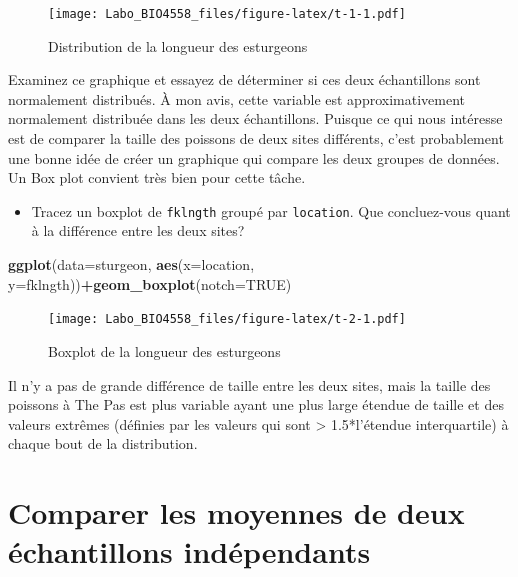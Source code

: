 \documentclass[12pt,]{book}
\newenvironment{Shaded}{\begin{snugshade}}{\end{snugshade}}
\newcommand{\DataTypeTok}[1]{\textcolor[rgb]{0.27,0.27,0.27}{#1}}
\newcommand{\KeywordTok}[1]{\textcolor[rgb]{0.27,0.27,0.27}{\textbf{#1}}}
\newcommand{\NormalTok}[1]{#1}
\newcommand{\OperatorTok}[1]{\textcolor[rgb]{0.43,0.43,0.43}{\textbf{#1}}}
\newcommand{\OtherTok}[1]{\textcolor[rgb]{0.37,0.37,0.37}{#1}}
\providecommand{\tightlist}{%
  \setlength{\itemsep}{0pt}\setlength{\parskip}{0pt}}
\begin{document}
\begin{figure}
\centering
\texttt{[image: Labo\_BIO4558\_files/figure-latex/t-1-1.pdf]}
\caption{\label{fig:t-1}Distribution de la longueur des esturgeons}
\end{figure}

Examinez ce graphique et essayez de déterminer si ces deux échantillons sont normalement distribués. À mon avis, cette variable est approximativement normalement distribuée dans les deux échantillons. Puisque ce qui nous intéresse est de comparer la taille des poissons de deux sites différents, c'est probablement une bonne idée de créer un graphique qui compare les deux groupes de données. Un Box plot convient très bien pour cette tâche.

\begin{itemize}
\tightlist
\item
  Tracez un boxplot de \texttt{fklngth} groupé par \texttt{location}. Que concluez-vous quant à la différence entre les deux sites?
\end{itemize}

\begin{Shaded}
\begin{Highlighting}[]
\KeywordTok{ggplot}\NormalTok{(}\DataTypeTok{data=}\NormalTok{sturgeon, }\KeywordTok{aes}\NormalTok{(}\DataTypeTok{x=}\NormalTok{location,}
\DataTypeTok{y=}\NormalTok{fklngth))}\OperatorTok{+}\KeywordTok{geom_boxplot}\NormalTok{(}\DataTypeTok{notch=}\OtherTok{TRUE}\NormalTok{)}
\end{Highlighting}
\end{Shaded}

\begin{figure}
\centering
\texttt{[image: Labo\_BIO4558\_files/figure-latex/t-2-1.pdf]}
\caption{\label{fig:t-2}Boxplot de la longueur des esturgeons}
\end{figure}

Il n'y a pas de grande différence de taille entre les deux sites, mais la taille des poissons à The Pas est plus variable ayant une plus large étendue de taille et des valeurs extrêmes (définies par les valeurs qui sont \textgreater{} 1.5*l'étendue interquartile) à chaque bout de la distribution.

\hypertarget{comparer-les-moyennes-de-deux-uxe9chantillons-induxe9pendants}{%
\section{Comparer les moyennes de deux échantillons indépendants}\label{comparer-les-moyennes-de-deux-uxe9chantillons-induxe9pendants}}
\end{document}
